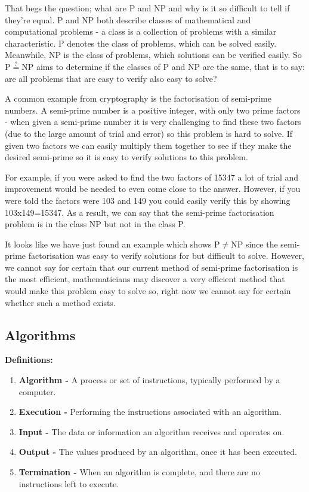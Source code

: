 \documentclass[twoside,10pt]{article}
\begin{document}
That begs the question; what are P and NP and why is it so difficult to tell if they're equal. P and NP both describe classes of mathematical and computational problems - a class is a collection of problems with a similar characteristic. P denotes the class of problems, which can be solved easily. Meanwhile, NP is the class of problems, which solutions can be verified easily. So P$\stackrel{?}{=}$NP aims to determine if the classes of P and NP are the same, that is to say: are all problems that are easy to verify also easy to solve?

A common example from cryptography is the factorisation of semi-prime numbers. A semi-prime number is a positive integer, with only two prime factors - when given a semi-prime number it is very challenging to find these two factors (due to the large amount of trial and error) so this problem is hard to solve. If given two factors we can easily multiply them together to see if they make the desired semi-prime so it is easy to verify solutions to this problem.

For example, if you were asked to find the two factors of 15347 a lot of trial and improvement would be needed to even come close to the answer. However, if you were told the factors were 103 and 149 you could easily verify this by showing 103x149=15347. As a result, we can say that the semi-prime factorisation problem is in the class NP but not in the class P.

It looks like we have just found an example which shows P$\neq$NP since the semi-prime factorisation was easy to verify solutions for but difficult to solve. However, we cannot say for certain that our current method of semi-prime factorisation is the most efficient, mathematicians may discover a very efficient method that would make this problem easy to solve so, right now we cannot say for certain whether such a method exists.

\subsection{Algorithms}
\textbf{Definitions:}
\begin{enumerate}
    \item \textbf{Algorithm -} A process or set of instructions, typically performed by a computer.
     \item \textbf{Execution -} Performing the instructions associated with an algorithm.
    \item \textbf{Input -} The data or information an algorithm receives and operates on.
    \item \textbf{Output -} The values produced by an algorithm, once it has been executed.
    \item \textbf{Termination -} When an algorithm is complete, and there are no instructions left to execute. 
\end{enumerate}
\end{document}
